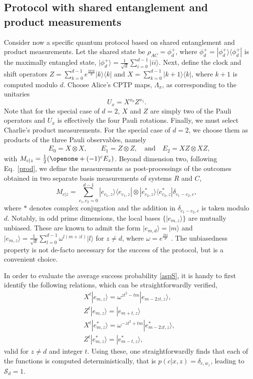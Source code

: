 \documentclass[aps,superscriptaddress,twocolumn,twoside,floatfix,pra,nofootinbib,a4paper]{revtex4-2}
\newcommand{\ket}[1]{\vert#1\rangle}
\newcommand{\ketbra}[2]{\vert #1\rangle\langle#2 \vert}
\begin{document}
\subsection{Protocol with shared entanglement and product measurements}
Consider now a specific quantum protocol based on shared entanglement and product measurements. Let the shared state be $\rho_{AC}=\phi^+_d$, where $\phi^+_d=|\phi^+_d \rangle\langle \phi^+_d|$ is the maximally entangled state, $|\phi^+_d\rangle=\frac{1}{\sqrt{d}}\sum_{i=0}^{d-1}\ket{ii}$. Next, define the clock and shift operators $Z=\sum_{k=0}^{d-1}e^{\frac{2\pi i k}{d}}\ketbra{k}{k}$ and $X=\sum_{k=0}^{d-1}\ketbra{k+1}{k}$, where $k+1$ is computed modulo $d$. Choose Alice's CPTP maps, $\Lambda_x$, as corresponding to the unitaries
\begin{equation}\label{WHunitary}
U_{x}=X^{x_0}Z^{x_1}.
\end{equation}
Note that for the special case of $d=2$, $X$ and $Z$ are simply two of the Pauli operators and $U_x$ is effectively the four Pauli rotations. Finally, we must select Charlie's product measurements. For the special case of $d=2$, we choose them as products of the three Pauli observables, namely
\begin{align}\label{pauli}
&E_0=X\otimes X, \qquad E_1=Z\otimes Z, \quad\text{and} \quad E_2=XZ\otimes XZ,
\end{align}
with $M_{c|z}=\frac{1}{2}(\openone+(-1)^c E_z)$. Beyond dimension two, following Eq.~\eqref{prod}, we define the measurements as post-processings of the outcomes obtained in two separate basis measurements of systems $R$ and $C$,
\begin{equation}\label{MUB}
M_{c|z}=\sum_{c_1,c_2=0}^{d-1} |e_{c_1,z}\rangle\langle e_{c_1,z}| \otimes |e_{c_2,z}^*\rangle\langle e_{c_2,z}^*| \delta_{c_1-c_2,c},
\end{equation}
where $*$ denotes complex conjugation and the addition in $\delta_{c_1-c_2,c}$ is taken modulo $d$. Notably, in odd prime dimensions, the local bases $\{|e_{m,z}\rangle\}$ are mutually unbiased. These are known to admit the form $\ket{e_{m,d}}=\ket{m}$ and
$|e_{m,z}\rangle=\frac{1}{\sqrt{d}}\sum_{l=0}^{d-1}\omega^{l(m+zl)}\ket{l}$ for $z\neq d$, where $\omega=e^{\frac{2\pi i}{d}}$ \cite{Wootters1989}. The unbiasedness property is not de-facto necessary for the success of the protocol, but is a convenient choice.

In order to evaluate the average success probability \eqref{aspS}, it is handy to first identify  the following relations, which can be straightforwardly verified,
\begin{align}\nonumber 
& X^t |e_{m,z}\rangle=\omega^{zt^2-tm} |e_{m-2zt,z}\rangle,  \\\nonumber
& Z^t |e_{m,z}\rangle= |e_{m+t,z}\rangle\\\nonumber
& X^t |e^*_{m,z}\rangle=\omega^{-zt^2+tm} |e^*_{m-2zt,z}\rangle,\\
& Z^t |e^*_{m,z}\rangle=|e^*_{m-t,z}\rangle,
\end{align}
valid for $z\neq d$ and integer $t$.  Using these, one straightforwardly finds that each of the functions is computed deterministically, that is $p(c|x,z) = \delta_{c,w_z}$, leading to $\mathcal{S}_d=1$. 
\end{document}
